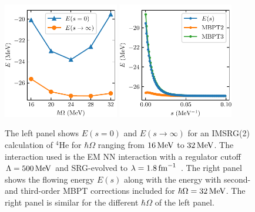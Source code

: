 \begin{figure}[t]
  \centering
  \includegraphics[width=0.45\textwidth]{thesis/doc/images/he4_imsrg2_energies.pdf}
  \includegraphics[width=0.45\textwidth]{thesis/doc/images/he4_imsrg2_flow.pdf}
  \caption[
    The left panel shows $E(s=0)$ and $E(s \rightarrow \infty)$
    for an IMSRG(2) calculation of ${}^4\text{He}$
    for $\hbar \Omega$ ranging from $16\mev$ to $32\mev$.
    The interaction used is the EM NN interaction
    with a regulator cutoff $\Lambda=500\mev$
    and SRG-evolved to $\lambda=1.8\invfm$.
    The right panel shows the flowing energy $E(s)$
    along with the energy with second- and third-order MBPT corrections included
    for $\hbar \Omega=32\mev$.
    The right panel is similar for the different $\hbar \Omega$ of the left panel.
  ]{
    The left panel shows $E(s=0)$ and $E(s \rightarrow \infty)$
    for an IMSRG(2) calculation of ${}^4\text{He}$
    for $\hbar \Omega$ ranging from $16\mev$ to $32\mev$.
    The interaction used is the EM NN interaction
    with a regulator cutoff $\Lambda=500\mev$
    and SRG-evolved to $\lambda=1.8\invfm$~\cite{Ente03n3lonn}.
    The right panel shows the flowing energy $E(s)$
    along with the energy with second- and third-order MBPT corrections included
    for $\hbar \Omega=32\mev$.
    The right panel is similar for the different $\hbar \Omega$ of the left panel.
  }\label{fig:imsrg2_he4_results}
\end{figure}

